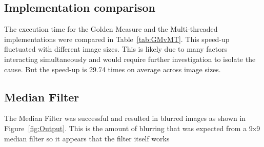 \subsection{Implementation comparison}

The execution time for the Golden Measure and the Multi-threaded implementations were compared in Table~\ref{tab:GMvMT}. This speed-up fluctuated with different image sizes. This is likely due to many factors interacting simultaneously and would require further investigation to isolate the cause. But the speed-up is 29.74 times on average across image sizes.


\subsection{Median Filter}

The Median Filter was successful and resulted in blurred images as shown in Figure~\ref{fig:Output}. This is the amount of blurring that was expected from a 9x9 median filter so it appears that the filter itself works





